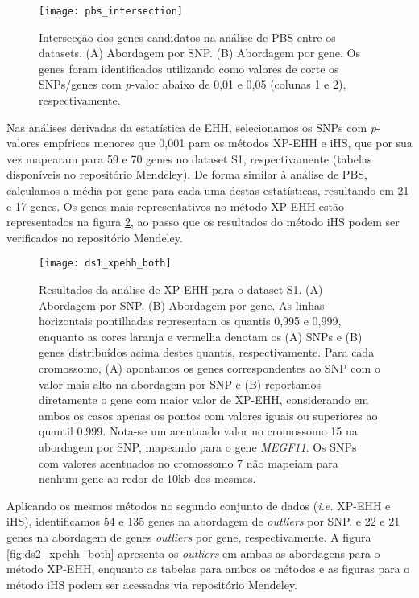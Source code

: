 
\begin{figure}[!htbp] %
    \centering
    \texttt{[image: pbs\_intersection]}
    \caption[Intersecção dos genes candidatos na análise de PBS entre os datasets]{Intersecção dos genes candidatos na análise de PBS entre os datasets. (A) Abordagem por SNP. (B) Abordagem por gene. Os genes foram identificados utilizando como valores de corte os SNPs/genes com \emph{p}-valor abaixo de 0,01 e 0,05 (colunas 1 e 2), respectivamente.}
    \label{fig:pbs_intersection}
\end{figure}

Nas análises derivadas da estatística de EHH, selecionamos os SNPs com \emph{p}-valores empíricos menores que 0,001 para os  métodos XP-EHH e iHS, que por sua vez mapearam para 59 e 70 genes no dataset S1, respectivamente (tabelas disponíveis no repositório Mendeley). De forma similar à análise de PBS, calculamos a média por gene para cada uma destas estatísticas, resultando em 21 e 17 genes. Os genes mais representativos no método XP-EHH estão representados na figura \ref{fig:ds1_xpehh_both}, ao passo que os resultados do método iHS podem ser verificados no repositório Mendeley.

\begin{figure}[!htbp] %
    \centering
    \texttt{[image: ds1\_xpehh\_both]}
    \caption[Resultados da análise de XP-EHH para o dataset S1.]{Resultados da análise de XP-EHH para o dataset S1. (A) Abordagem por SNP. (B) Abordagem por gene. As linhas horizontais pontilhadas representam os quantis 0,995 e 0,999, enquanto as cores laranja e vermelha denotam os (A) SNPs e (B) genes distribuídos acima destes quantis, respectivamente. Para cada cromossomo, (A) apontamos os genes correspondentes ao SNP com o valor mais alto na abordagem por SNP e (B) reportamos diretamente o gene com maior valor de XP-EHH, considerando em ambos os casos apenas os pontos com valores iguais ou superiores ao quantil 0.999. Nota-se um acentuado valor no cromossomo 15 na abordagem por SNP, mapeando para o gene \textsl{MEGF11}. Os SNPs com valores acentuados no cromossomo 7 não mapeiam para nenhum gene ao redor de 10kb dos mesmos.}
    \label{fig:ds1_xpehh_both}
\end{figure}

Aplicando os mesmos métodos no segundo conjunto de dados (\emph{i.e.} XP-EHH e iHS), identificamos 54 e 135 genes na abordagem de \textsl{outliers} por SNP, e 22 e 21 genes na abordagem de genes \textsl{outliers} por gene, respectivamente. A figura \ref{fig:ds2_xpehh_both} apresenta os \textsl{outliers} em ambas as abordagens para o método XP-EHH, enquanto as tabelas para ambos os métodos e as figuras para o método iHS podem ser acessadas via repositório Mendeley.

